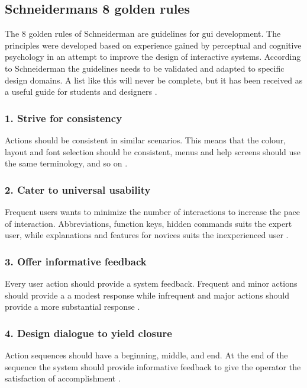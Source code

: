 \subsection{Schneidermans 8 golden rules}
\label{sec:schneiderman}
The 8 golden rules of Schneiderman are guidelines for \acrshort{gui} development. The principles were developed based on experience gained by perceptual and cognitive psychology in an attempt to improve the design of interactive systems. According to Schneiderman the guidelines needs to be validated and adapted to specific design domains. A list like this will never be complete, but it has been received as a useful guide for students and designers \cite{schneiderman}.

\subsubsection{1. Strive for consistency}
Actions should be consistent in similar scenarios. This means that the colour, layout and font selection should be consistent, menus and help screens should use the same terminology, and so on \cite{schneiderman}.

\subsubsection{2. Cater to universal usability}
Frequent users wants to minimize the number of interactions to increase the pace of interaction. Abbreviations, function keys, hidden commands suits the expert user, while explanations and features for novices suits the inexperienced user \cite{schneiderman}.

\subsubsection{3. Offer informative feedback}
Every user action should provide a system feedback. Frequent and minor actions should provide a a modest response while infrequent and major actions should provide a more substantial response \cite{schneiderman}.

\subsubsection{4. Design dialogue to yield closure}
Action sequences should have a beginning, middle, and end. At the end of the sequence the system should provide informative feedback to give the operator the satisfaction of accomplishment \cite{schneiderman}.

